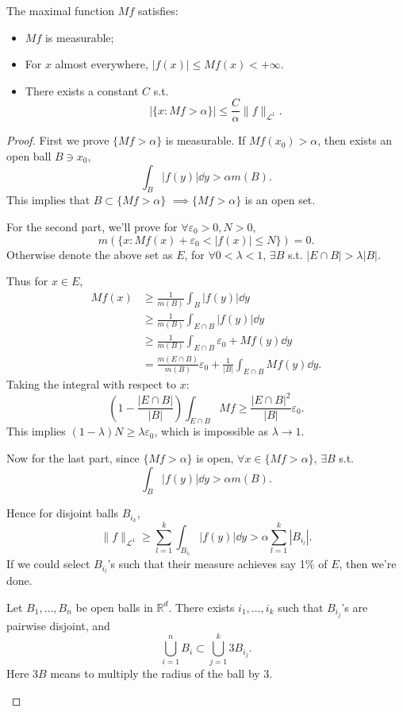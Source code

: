 \begin{theorem}
    The maximal function $Mf$ satisfies:
	 \begin{itemize}
	 	\item $Mf$ is measurable;
		\item For  $x$ almost everywhere,  $|f(x)|\le Mf(x)<+\infty$.

		\item There exists a constant $C$ s.t.
			 \[
			\left|\{x: Mf> \alpha\}\right| \le
			\frac{C}{\alpha}\lVert f \rVert _{\mathcal{L}^1}.
			\]
	 \end{itemize}
\end{theorem}
\begin{proof}[Proof]
    First we prove $\{Mf>\alpha\}$ is measurable.
	If $Mf(x_0)>\alpha$, then exists an open ball $B\ni x_0$,
	\[
	\int_B |f(y)|\dd y > \alpha m(B).
	\]
	This implies that $B \subset \{Mf>\alpha\}$
	$ \implies \{Mf>\alpha\}$ is an open set.

	For the second part, we'll prove for $\forall \varepsilon_0>0, N>0$,
	\[
	m(\{x: Mf(x)+ \varepsilon_0<|f(x)|\le N\}) = 0.
	\]
	Otherwise denote the above set as $E$,
	for  $\forall 0<\lambda<1$,  $\exists B$
	s.t. $|E\cap B|>\lambda |B|$.

	Thus for $x\in E$,
	 \begin{align*}
		 Mf(x) &\ge \frac{1}{m(B)}\int_B |f(y)|\dd y\\
			   &\ge \frac{1}{m(B)}\int _{E\cap B}|f(y)|\dd y\\
			   &\ge \frac{1}{m(B)}\int_{E\cap B} \varepsilon_0+Mf(y)\dd y\\
			   &= \frac{m(E\cap B)}{m(B)}\varepsilon_0
			   + \frac{1}{|B|}\int _{E\cap B} Mf(y)\dd y.
	\end{align*}
	Taking the integral with respect to $x$:
	 \[
	\left( 1-\frac{|E\cap B|}{|B|} \right)\int_{E\cap B} Mf
	\ge \frac{|E\cap B|^2}{|B|}\varepsilon_0.
	\]
	This implies $(1-\lambda)N \ge \lambda\varepsilon_0$, which is impossible
	as $\lambda\to 1$.

	Now for the last part, since $\{Mf>\alpha\}$ is open,
	$\forall x\in \{Mf>\alpha\}$, $\exists B$ s.t.
	 \[
	\int_B |f(y)|\dd y >\alpha m(B).
	\]

	Hence for disjoint balls $B_{i_k}$,
	\[
	\lVert f \rVert _{\mathcal{L}^1}\ge
	\sum_{l=1}^k \int_{B_{i_l}}|f(y)|\dd y > \alpha\sum_{l=1}^k |B_{i_l}|.
	\]
	If we could select $B_{i_l}$'s such that their measure achieves
	say 1\% of $E$, then we're done.

	\begin{lemma}
		Let $B_1,\dots,B_n$ be open balls in $\mathbb{R}^d$.
		There exists $i_1,\dots,i_k$ such that $B_{i_j}$'s are
		pairwise disjoint, and
		\[
		\bigcup_{i=1}^n B_i \subset \bigcup_{j=1}^k 3B_{i_j}.
		\]
		Here $3B$ means to multiply the radius of the ball by 3.
	\end{lemma}
\end{proof}

